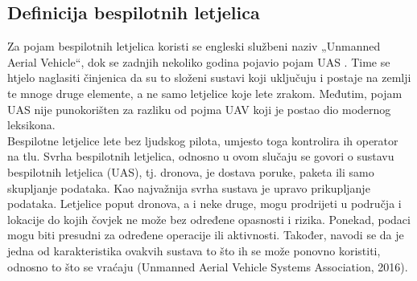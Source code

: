 \documentclass[times, utf8, diplomski]{fer}
\begin{document}
\subsection{Definicija bespilotnih letjelica}
Za pojam bespilotnih letjelica koristi se engleski službeni naziv „Unmanned Aerial Vehicle“,  dok  se  zadnjih  nekoliko  godina  pojavio  pojam  UAS  . Time se htjelo naglasiti činjenica da su to složeni sustavi koji uključuju i postaje na zemlji te mnoge druge elemente, a ne samo letjelice koje lete zrakom. Međutim, pojam UAS nije punokorišten za razliku od pojma UAV koji je postao dio modernog leksikona.\\
Bespilotne letjelice lete bez ljudskog pilota, umjesto toga kontrolira ih operator na tlu. Svrha bespilotnih letjelica, odnosno u ovom slučaju se govori o sustavu bespilotnih letjelica (UAS),  tj.  dronova, je  dostava poruke,  paketa  ili  samo  skupljanje  podataka. Kao najvažnija svrha sustava je upravo prikupljanje podataka. Letjelice poput dronova, a i neke druge, mogu prodrijeti  u  područja  i  lokacije  do  kojih  čovjek  ne  može  bez  određene  opasnosti  i  rizika. Ponekad, podaci mogu biti presudni za određene operacije ili aktivnosti. Također, navodi se da je jedna od karakteristika ovakvih sustava to što ih se može ponovno koristiti, odnosno to što se vraćaju (Unmanned Aerial Vehicle Systems Association, 2016).
\end{document}
